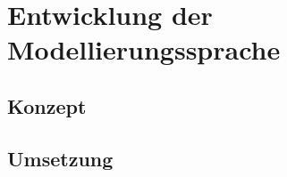 \chapter{Entwicklung der Modellierungssprache}
\label{ch:Implementation}

\section{Konzept}

\section{Umsetzung}
